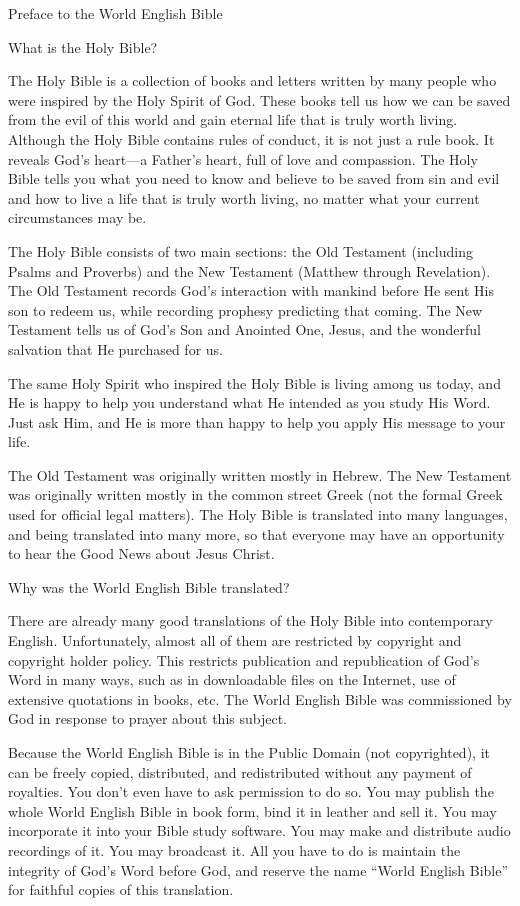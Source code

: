 ﻿\NormalFont{}
{\MT Preface to the World English Bible
\par }{\IS What is the Holy Bible?
\par }{\IP The Holy Bible is a collection of books and letters written by many people who were inspired by the Holy Spirit of God. These books tell us how we can be saved from the evil of this world and gain eternal life that is truly worth living. Although the Holy Bible contains rules of conduct, it is not just a rule book. It reveals God’s heart—a Father’s heart, full of love and compassion. The Holy Bible tells you what you need to know and believe to be saved from sin and evil and how to live a life that is truly worth living, no matter what your current circumstances may be.
\par }{\IP The Holy Bible consists of two main sections: the Old Testament (including Psalms and Proverbs) and the New Testament (Matthew through Revelation). The Old Testament records God’s interaction with mankind before He sent His son to redeem us, while recording prophesy predicting that coming. The New Testament tells us of God’s Son and Anointed One, Jesus, and the wonderful salvation that He purchased for us.
\par }{\IP The same Holy Spirit who inspired the Holy Bible is living among us today, and He is happy to help you understand what He intended as you study His Word. Just ask Him, and He is more than happy to help you apply His message to your life.
\par }{\IP The Old Testament was originally written mostly in Hebrew. The New Testament was originally written mostly in the common street Greek (not the formal Greek used for official legal matters). The Holy Bible is translated into many languages, and being translated into many more, so that everyone may have an opportunity to hear the Good News about Jesus Christ.
\par }{\IS Why was the World English Bible translated?
\par }{\IP There are already many good translations of the Holy Bible into contemporary English. Unfortunately, almost all of them are restricted by copyright and copyright holder policy. This restricts publication and republication of God’s Word in many ways, such as in downloadable files on the Internet, use of extensive quotations in books, etc. The World English Bible was commissioned by God in response to prayer about this subject.
\par }{\IP Because the World English Bible is in the Public Domain (not copyrighted), it can be freely copied, distributed, and redistributed without any payment of royalties. You don’t even have to ask permission to do so. You may publish the whole World English Bible in book form, bind it in leather and sell it. You may incorporate it into your Bible study software. You may make and distribute audio recordings of it. You may broadcast it. All you have to do is maintain the integrity of God’s Word before God, and reserve the name “World English Bible” for faithful copies of this translation.
}
